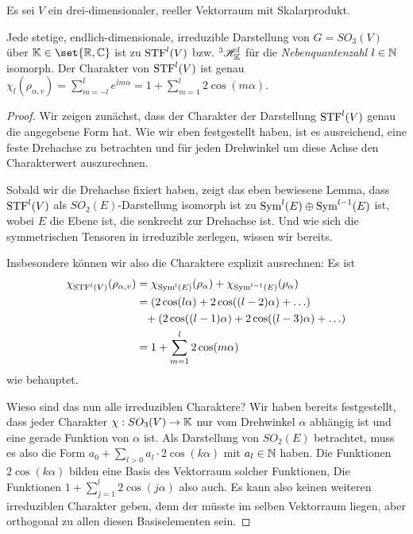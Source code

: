 \begin{theoremdef}
Es sei $V$ ein drei-dimensionaler, reeller Vektorraum mit Skalarprodukt.

Jede stetige, endlich-dimensionale, irreduzible Darstellung von $G=SO_3(V)$ über $\IK\in\set{\IR,\IC}$ ist zu $\operatorname{STF}^l(V)$ bzw. ${^3}\mathscr{H}_{\mathbb{K}}^l$ für die \emph{Nebenquantenzahl} $l\in\mathbb{N}$ isomorph. Der Charakter von $\operatorname{STF}^l(V)$ ist genau $\chi_l(\rho_{\alpha,v}) = \sum_{m=-l}^l e^{im\alpha} = 1+\sum_{m=1}^l 2\cos(m\alpha)$.
\end{theoremdef}
\begin{proof}
Wir zeigen zunächst, dass der Charakter der Darstellung $\operatorname{STF}^l(V)$ genau die angegebene Form hat. Wie wir eben festgestellt haben, ist es ausreichend, eine feste Drehachse zu betrachten und für jeden Drehwinkel um diese Achse den Charakterwert auszurechnen.

Sobald wir die Drehachse fixiert haben, zeigt das eben bewiesene Lemma, dass $\operatorname{STF}^l(V)$ als $SO_2(E)$-Darstellung isomorph ist zu $\operatorname{Sym}^l(E)\oplus \operatorname{Sym}^{l-1}(E)$ ist, wobei $E$ die Ebene ist, die senkrecht zur Drehachse ist. Und wie sich die symmetrischen Tensoren in irreduzible zerlegen, wissen wir bereits.

Insbesondere können wir also die Charaktere explizit ausrechnen: Es ist
\begin{align*}
    \chi_{\operatorname{STF}^l(V)}(\rho_{\alpha,v}) &= \chi_{\operatorname{Sym}^l(E)}(\rho_\alpha) + \chi_{\operatorname{Sym}^{l-1}(E)}(\rho_\alpha) \\
    &= (2\cos(l\alpha)+2\cos((l-2)\alpha)+\ldots) \\ &\phantom{=}+(2\cos((l-1)\alpha)+2\cos((l-3)\alpha) +\ldots) \\
    &= 1+\sum_{m=1}^l 2\cos(m\alpha)
\end{align*}
wie behauptet.

\medbreak
Wieso sind das nun alle irreduziblen Charaktere? Wir haben bereits festgestellt, dass jeder Charakter $\chi: SO_3(V)\to\mathbb{K}$ nur vom Drehwinkel $\alpha$ abhängig ist und eine gerade Funktion von $\alpha$ ist. Als Darstellung von $SO_2(E)$ betrachtet, muss es also die Form $a_0 + \sum_{l>0} a_l\cdot 2\cos(k\alpha)$ mit $a_l\in\mathbb{N}$ haben. Die Funktionen $2\cos(k\alpha)$ bilden eine Basis des Vektorraum solcher Funktionen, Die Funktionen $1+\sum_{j=1}^l 2\cos(j\alpha)$ also auch. Es kann also keinen weiteren irreduziblen Charakter geben, denn der müsste im selben Vektorraum liegen, aber orthogonal zu allen diesen Basiselementen sein.
\end{proof}

